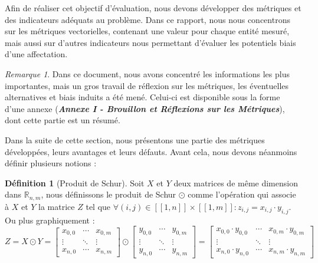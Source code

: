 \documentclass{rapport}
\theoremstyle{definition}
\newtheorem{definition}{Définition}
\theoremstyle{remark}
\theoremstyle{plain}
\theoremstyle{definition}
\theoremstyle{remark}
\newtheorem{remark}{Remarque}
\newcommand{\llbracket}{[\![}
\newcommand{\rrbracket}{]\!]}
\begin{document}
Afin de réaliser cet objectif d'évaluation, nous devons développer des métriques et des indicateurs adéquats au problème.
Dans ce rapport, nous nous concentrons sur les métriques vectorielles, contenant une valeur pour chaque entité mesuré, mais aussi sur d'autres indicateurs nous permettant d'évaluer les potentiels biais d'une affectation. 

\begin{remark}
    Dans ce document, nous avons concentré les informations les plus importantes, mais un gros travail de réflexion sur les métriques, les éventuelles alternatives et biais induits a été mené. Celui-ci est disponible sous la forme d'une annexe (\textbf{\textit{Annexe I - Brouillon et Réflexions sur les Métriques}}), dont cette partie est un résumé.
\end{remark}

Dans la suite de cette section, nous présentons une partie des métriques développées, leurs avantages et leurs défauts.
Avant cela, nous devons néanmoins définir plusieurs notions :

\begin{definition}[Produit de Schur]
    Soit $X$ et $Y$ deux matrices de même dimension dans $\mathbb{R}_{n,m}$, nous définissons le produit de Schur $\odot$
    comme l'opération qui associe à $X$ et $Y$ la matrice $Z$ tel que $\forall (i,j)\in\llbracket 1,n\rrbracket\times\llbracket 1,m\rrbracket:z_{i,j}=x_{i,j}\cdot y_{i,j}$. Ou plus graphiquement :
    $$
    Z = X\odot Y = \begin{bmatrix}
        x_{0,0} & \cdots & x_{0,m} \\
        \vdots & \ddots & \vdots \\
        x_{n,0} & \cdots & x_{n,m}
    \end{bmatrix} \odot \begin{bmatrix}
        y_{0,0} & \cdots & y_{0,m} \\
        \vdots & \ddots & \vdots \\
        y_{n,0} & \cdots & y_{n,m}
    \end{bmatrix} = \begin{bmatrix}
        x_{0,0}\cdot y_{0,0} & \cdots & x_{0,m}\cdot y_{0,m} \\
        \vdots & \ddots & \vdots \\
        x_{n,0}\cdot y_{n,0} & \cdots & x_{n,m}\cdot y_{n,m}
    \end{bmatrix}
    $$
\end{definition}
\end{document}

